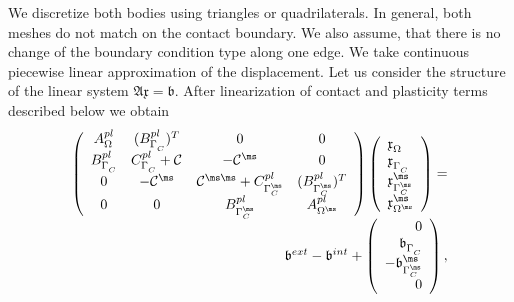 
We discretize both bodies using triangles or quadrilaterals. In general, both meshes do not match on the contact boundary. We also assume, that there is no change of the boundary condition type along one edge. We take continuous piecewise linear approximation of the displacement. Let us consider the structure of the linear system $\mathfrak  A \mathfrak x = {\mathfrak b} $. After linearization of contact and plasticity terms described below we obtain
\begin{equation*}
 \begin{array}{r}
   \left (
   \begin{array}{cccc}
   A^{pl}_{\Omega^{\sl}}    & (B^{pl}_{\Gamma^{\sl}_C})^{T}                 & 0                & 0\\
   B^{pl}_{\Gamma^{\sl}_C} & C^{pl}_{\Gamma^{\sl}_C} + \mathcal{C}^{\sl\sl}   & -\mathcal{C}^{\sl \ms}& 0 \\
   0               & -\mathcal{C}^{\ms \sl} & \mathcal{C}^{\ms \ms}+C^{pl}_{\Gamma^{\ms}_C}   & (B^{pl}_{\Gamma^{\ms}_C})^T \\
   0               & 0                 & B^{pl}_{\Gamma^{\ms}_C} & A^{pl}_{\Omega^{\ms}}
   \end{array}
   \right )
 \left (
  \begin{array}{l}
      \mathfrak x^{\sl}_{\Omega^{\sl}} \\
      \mathfrak x^{\sl}_{\Gamma_C^{\sl}} \\
      \mathfrak x^{\ms}_{\Gamma_C^{\ms}} \\
      \mathfrak x^{\ms}_{\Omega^{\ms}} 
  \end{array}
 \right )
= \\
 {\mathfrak b}^{ext} - {\mathfrak b}^{int} +
 \left (
  \begin{array}{r}
      0 \\
      {\mathfrak b}^{\sl}_{\Gamma_C^{\sl}} \\
      -{\mathfrak b}^{\ms}_{\Gamma_C^{\ms}} \\
      0 
  \end{array}
 \right ),
 \end{array}
\end{equation*}
